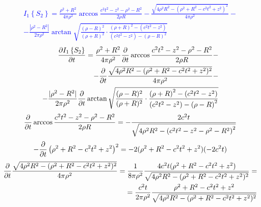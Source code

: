 \textcolor{blue}{ \begin{equation*} \begin{aligned}
I_1 \left\{ S_2 \right\} = \frac{\rho^2 + R^2}{4 \pi \rho^2} \arccos 
\frac{c^2 t^2 - z^2 - \rho^2 - R^2}{2 \rho R}  -
\frac{\sqrt{4 \rho^2 R^2 - (\rho^2 + R^2 - c^2t^2 + z^2)^2}}{4 \pi \rho^2} - \\
- \frac{ |\rho^2 - R^2| }{2 \pi \rho^2} 
\arctan \sqrt{ \frac{(\rho - R)^2}{(\rho + R)^2} \cdot
\frac{\left( \rho + R \right)^2 - \left( c^2t^2 - z^2 \right)} 
{\left( c^2t^2 - z^2 \right) - \left( \rho - R \right)^2} }
\end{aligned} \end{equation*} }
%
\textcolor{blue}{ \begin{equation*} \begin{aligned}
\frac{\partial I_1 \left\{ S_2 \right\}}{\partial t} = \frac{\rho^2 + R^2}{4 \pi \rho^2}
\frac{\partial }{\partial t} \arccos \frac{c^2 t^2 - z^2 - \rho^2 - R^2}{2 \rho R} - \\
- \frac{\partial }{\partial t} \frac{\sqrt{4 \rho^2 R^2 - (\rho^2 + R^2 - c^2t^2 + z^2)^2}}
{4 \pi \rho^2} - \\ - \frac{ |\rho^2 - R^2| }{2 \pi \rho^2} \frac{\partial }{\partial t} 
\arctan \sqrt{ \frac{(\rho - R)^2}{(\rho + R)^2} \cdot
\frac{\left( \rho + R \right)^2 - \left( c^2t^2 - z^2 \right)} 
{\left( c^2t^2 - z^2 \right) - \left( \rho - R \right)^2} }
\end{aligned} \end{equation*} }
%
\textcolor{blue}{ \begin{equation*} \begin{aligned}
\frac{\partial }{\partial t} \arccos \frac{c^2 t^2 - z^2 - \rho^2 - R^2}{2 \rho R} = 
- \frac{2 c^2 t}
{ \sqrt{4 \rho^2 R^2 - \left(c^2 t^2 - z^2 - \rho^2 - R^2 \right)^2} }
\end{aligned} \end{equation*} }
%
\textcolor{blue}{ \begin{equation*} \begin{aligned}
- \frac{\partial }{\partial t} \left( \rho^2 + R^2 - c^2t^2 + z^2 \right)^2 = 
- 2 (\rho^2 + R^2 -c^2t^2 + z^2) (-2 c^2 t)
\end{aligned} \end{equation*} }
%
\textcolor{blue}{ \begin{equation*} \begin{aligned}
\frac{\partial }{\partial t} \frac{\sqrt{4 \rho^2 R^2 - (\rho^2 + R^2 - c^2t^2 + z^2)^2}}
{4 \pi \rho^2} = \frac{1}{8 \pi \rho^2} 
\frac{ 4 c^2 t (\rho^2 + R^2 - c^2 t^2 + z^2) }
{ \sqrt{4 \rho^2 R^2 - (\rho^2 + R^2 - c^2t^2 + z^2)^2} } = \\
= \frac{c^2 t}{2 \pi \rho^2} \frac{\rho^2 + R^2 - c^2 t^2 + z^2}
{ \sqrt{4 \rho^2 R^2 - (\rho^2 + R^2 - c^2t^2 + z^2)^2} }
\end{aligned} \end{equation*} }
